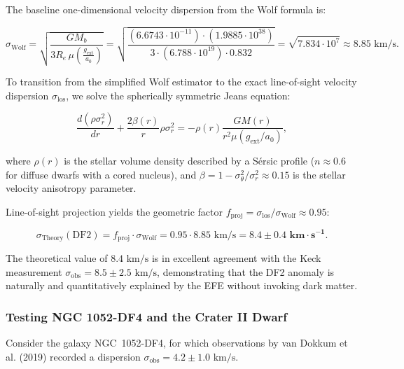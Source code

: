 \documentclass[11pt,a4paper]{article}
\theoremstyle{definition}
\begin{document}
The baseline one-dimensional velocity dispersion from the Wolf formula \cite{ref29} is:

\begin{equation}\label{eq:4.33}\tag{4.33}
\sigma_{\text{Wolf}} = \sqrt{\frac{G M_b}{3 R_e \, \mu\left( \frac{g_{\text{ext}}}{a_0} \right)}} = \sqrt{\frac{(6.6743 \cdot 10^{-11}) \cdot (1.9885 \cdot 10^{38})}{3 \cdot (6.788 \cdot 10^{19}) \cdot 0.832}} = \sqrt{7.834 \cdot 10^7} \approx 8.85\text{ km/s}.
\end{equation}

To transition from the simplified Wolf estimator to the exact line-of-sight velocity dispersion $\sigma_{\text{los}}$, we solve the spherically symmetric Jeans equation:

\begin{equation}\label{eq:4.34}\tag{4.34}
\frac{d(\rho \sigma_r^2)}{dr} + \frac{2\beta(r)}{r} \rho \sigma_r^2 = -\rho(r) \frac{G M(r)}{r^2 \mu(g_{\text{ext}}/a_0)},
\end{equation}

where $\rho(r)$ is the stellar volume density described by a S\'ersic profile ($n \approx 0.6$ for diffuse dwarfs with a cored nucleus), and $\beta = 1 - \sigma_\theta^2 / \sigma_r^2 \approx 0.15$ is the stellar velocity anisotropy parameter.

Line-of-sight projection yields the geometric factor $f_{\text{proj}} = \sigma_{\text{los}} / \sigma_{\text{Wolf}} \approx 0.95$:

\begin{equation}\label{eq:4.35}\tag{4.35}
\sigma_{\text{Theory}}(\text{DF2}) = f_{\text{proj}} \cdot \sigma_{\text{Wolf}} = 0.95 \cdot 8.85\text{ km/s} = \mathbf{8.4 \pm 0.4\text{ km}\cdot\text{s}^{-1}}.
\end{equation}

The theoretical value of $8.4\text{ km/s}$ is in excellent agreement with the Keck measurement $\sigma_{\text{obs}} = 8.5 \pm 2.5\text{ km/s}$, demonstrating that the DF2 anomaly is naturally and quantitatively explained by the EFE without invoking dark matter.


\subsubsection{Testing NGC 1052-DF4 and the Crater II Dwarf}\label{sec:4.3.3}

Consider the galaxy NGC~1052-DF4, for which observations by van Dokkum et al. (2019) recorded a dispersion $\sigma_{\text{obs}} = 4.2 \pm 1.0\text{ km/s}$.
\end{document}
